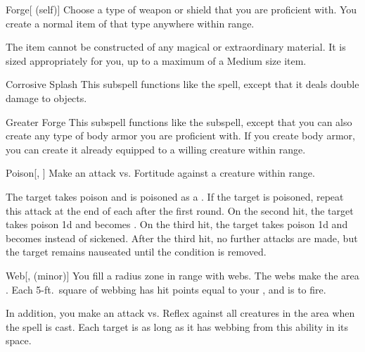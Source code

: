 \begin{ability}[\nth{1}]{Forge}[ (self)]
Choose a type of weapon or shield that you are proficient with.
You create a normal item of that type anywhere within \rngclose range.

The item cannot be constructed of any magical or extraordinary material.
It is sized appropriately for you, up to a maximum of a Medium size item.
\end{ability}
\vspace{0.25em}


\begin{ability}[\nth{2}]{Corrosive Splash}
This subspell functions like the  spell, except that it deals double damage to objects.
\end{ability}
\vspace{0.25em}


\begin{ability}[\nth{2}]{Greater Forge}
This subspell functions like the  subspell, except that you can also create any type of body armor you are proficient with.
If you create body armor, you can create it already equipped to a willing creature within range.
\end{ability}
\vspace{0.25em}


\begin{ability}[\nth{2}]{Poison}[, ]
Make an attack vs. Fortitude against a creature within \rngmed range.

\hit The target takes poison  and is poisoned as a .
If the target is poisoned, repeat this attack at the end of each  after the first round.
On the second hit, the target takes poison  \minus1d and becomes .
On the third hit, the target takes poison  \plus1d and becomes  instead of sickened.
After the third hit, no further attacks are made, but the target remains nauseated until the condition is removed.
\end{ability}
\vspace{0.25em}


\begin{ability}[\nth{2}]{Web}[,  (minor)]
You fill a \areasmall radius zone in \rngclose range with webs.
The webs make the area .
Each 5-ft.\ square of webbing has hit points equal to your , and is  to fire.

In addition, you make an attack vs. Reflex against all creatures in the area when the spell is cast.
\hit Each target is \immobilized as long as it has webbing from this ability in its space.
\end{ability}
\vspace{0.25em}


